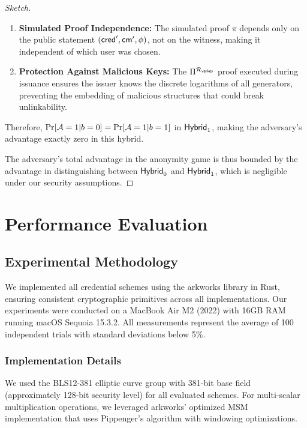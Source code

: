 \begin{proof}[Sketch]
\begin{enumerate}
    \item \textbf{Simulated Proof Independence:} The simulated proof $\pi$ depends only on the public statement $(\mathsf{cred}', \mathsf{cm}', \phi)$, not on the witness, making it independent of which user was chosen.
    
    \item \textbf{Protection Against Malicious Keys:} The $\Pi^{\mathcal{R}_{\mathsf{verkey}}}$ proof executed during issuance ensures the issuer knows the discrete logarithms of all generators, preventing the embedding of malicious structures that could break unlinkability.
\end{enumerate}

Therefore, $\Pr[\mathcal{A} = 1 | b = 0] = \Pr[\mathcal{A} = 1 | b = 1]$ in $\mathsf{Hybrid}_1$, making the adversary's advantage exactly zero in this hybrid.

The adversary's total advantage in the anonymity game is thus bounded by the advantage in distinguishing between $\mathsf{Hybrid}_0$ and $\mathsf{Hybrid}_1$, which is negligible under our security assumptions.
\end{proof}



\section{Performance Evaluation}

\subsection{Experimental Methodology}

We implemented all credential schemes using the arkworks library \cite{arkworks_contributors_arkworks_2022} in Rust, ensuring consistent cryptographic primitives across all implementations. Our experiments were conducted on a MacBook Air M2 (2022) with 16GB RAM running macOS Sequoia 15.3.2. All measurements represent the average of 100 independent trials with standard deviations below 5\%.

\subsubsection{Implementation Details}
We used the BLS12-381 elliptic curve group with 381-bit base field (approximately 128-bit security level) for all evaluated schemes. For multi-scalar multiplication operations, we leveraged arkworks' optimized MSM implementation that uses Pippenger's algorithm with windowing optimizations.

